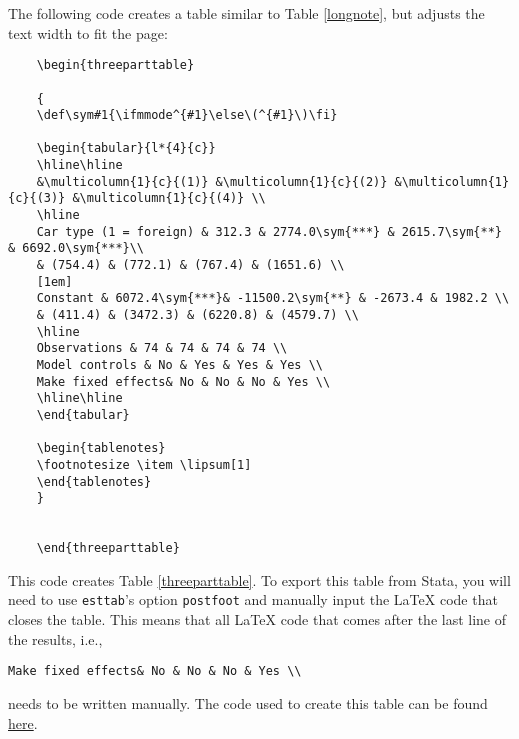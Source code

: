\documentclass[11pt,a4paper]{article}
\def\sym#1{\ifmmode^{#1}\else\(^{#1}\)\fi}
\begin{document}
The following code creates a table similar to Table \ref{longnote}, but adjusts the text width to fit the page:

\begin{samepage}
	\scriptsize
	\begin{verbatim}
	\begin{threeparttable}
	
	{
	\def\sym#1{\ifmmode^{#1}\else\(^{#1}\)\fi}
	
	\begin{tabular}{l*{4}{c}}
	\hline\hline
	&\multicolumn{1}{c}{(1)} &\multicolumn{1}{c}{(2)} &\multicolumn{1}{c}{(3)} &\multicolumn{1}{c}{(4)} \\
	\hline
	Car type (1 = foreign) & 312.3 & 2774.0\sym{***} & 2615.7\sym{**} & 6692.0\sym{***}\\
	& (754.4) & (772.1) & (767.4) & (1651.6) \\
	[1em]
	Constant & 6072.4\sym{***}& -11500.2\sym{**} & -2673.4 & 1982.2 \\ 
	& (411.4) & (3472.3) & (6220.8) & (4579.7) \\
	\hline
	Observations & 74 & 74 & 74 & 74 \\
	Model controls & No & Yes & Yes & Yes \\
	Make fixed effects& No & No & No & Yes \\
	\hline\hline 
	\end{tabular}
	
	\begin{tablenotes} 
	\footnotesize \item \lipsum[1] 
	\end{tablenotes}
	}
	
	
	\end{threeparttable}
	\end{verbatim}
\end{samepage}

This code creates Table \ref{threeparttable}. To export this table from Stata, you will need to use \texttt{esttab}'s option \texttt{postfoot} and manually input the {\LaTeX} code that closes the table. This means that all {\LaTeX} code that comes after the last line of the results, i.e.,
\begin{verbatim}
Make fixed effects& No & No & No & Yes \\
\end{verbatim}
needs to be written manually. The code used to create this table can be found \href{https://gist.github.com/luizaandrade/a9b830f4284b414ffe8d8271a83cbbe9}{here}.
\end{document}
